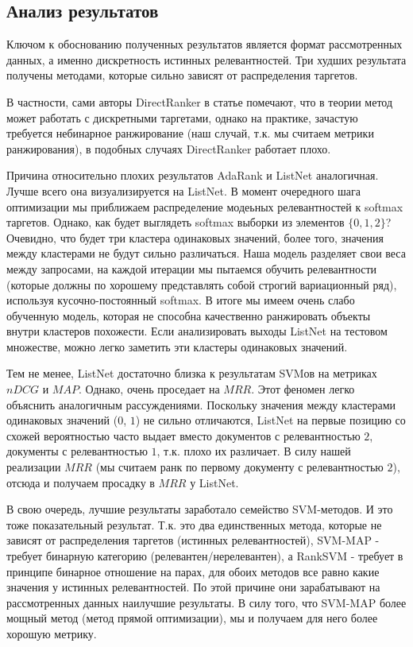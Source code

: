 \documentclass{article}[16pt]
\begin{document}
	\subsection{Анализ результатов}
	Ключом к обоснованию полученных результатов является формат рассмотренных данных, а именно дискретность истинных релевантностей. Три худших результата получены методами, которые сильно зависят от распределения таргетов. 
	
	В частности, сами авторы DirectRanker в статье помечают, что в теории метод может работать с дискретными таргетами, однако на практике, зачастую требуется небинарное ранжирование (наш случай, т.к. мы считаем метрики ранжирования), в подобных случаях DirectRanker работает плохо. 
	
	Причина относительно плохих результатов AdaRank и ListNet аналогичная. Лучше всего она визуализируется на ListNet. В момент очередного шага оптимизации мы приближаем распределение модеьных релевантностей к softmax таргетов. Однако, как будет выглядеть softmax выборки из элементов $\{0, 1, 2\}$? Очевидно, что будет три кластера одинаковых значений, более того, значения между кластерами не будут сильно различаться. Наша модель разделяет свои веса между запросами, на каждой итерации мы пытаемся обучить релевантности (которые должны по хорошему представлять собой строгий вариационный ряд), используя кусочно-постоянный softmax. В итоге мы имеем очень слабо обученную модель, которая не способна качественно ранжировать объекты внутри кластеров похожести. Если анализировать выходы ListNet на тестовом множестве, можно легко заметить эти кластеры одинаковых значений. 
	
	Тем не менее, ListNet достаточно близка к результатам SVMов на метриках $nDCG$ и $MAP$. Однако, очень проседает на $MRR$. Этот феномен легко объяснить аналогичным рассуждениями. Поскольку значения между кластерами одинаковых значений ($0$, $1$) не сильно отличаются, ListNet на первые позицию со схожей вероятностью часто выдает вместо документов с релевантностью $2$, документы с релевантностью $1$, т.к. плохо их различает. В силу нашей реализации $MRR$ (мы считаем ранк по первому документу с релевантностью $2$), отсюда и получаем просадку в $MRR$ у ListNet.
	
	В свою очередь, лучшие результаты заработало семейство SVM-методов. И это тоже показательный результат. Т.к. это два единственных метода, которые не зависят от распределения таргетов (истинных релевантностей), SVM-MAP - требует бинарную категорию (релевантен/нерелевантен), а RankSVM - требует в принципе бинарное отношение на парах, для обоих методов все равно какие значения у истинных релевантностей. По этой причине они зарабатывают на рассмотренных данных наилучшие результаты. В силу того, что SVM-MAP более мощный метод (метод прямой оптимизации), мы и получаем для него более хорошую метрику.
	
\end{document}
